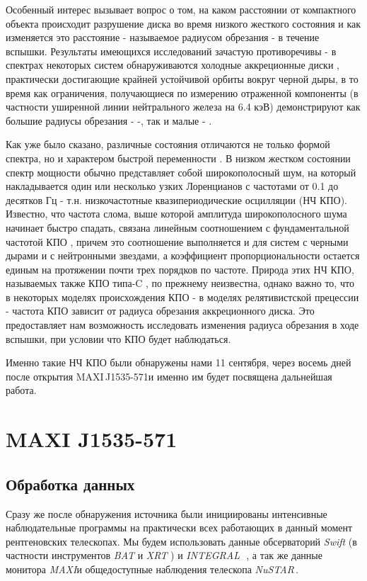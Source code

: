 \documentclass{pazhb}
\def\maxisrc{MAXI\,J1535-571}
\def\maxi{{\em MAXI}}
\def\nustar{{\em NuSTAR\,}}
\def\integral{{\em INTEGRAL\,}}
\begin{document}
Особенный интерес вызывает вопрос о том, на каком расстоянии от компактного объекта происходит разрушение диска во время низкого жесткого состояния и как изменяется это расстояние - называемое радиусом обрезания - в течение вспышки. Результаты имеющихся исследований зачастую противоречивы - в спектрах некоторых систем обнаруживаются холодные аккреционные диски \citep[с температурой в 0.1..0.5 кэВ:][]{miller06, miller06gx339,reis11}, практически достигающие крайней устойчивой орбиты вокруг черной дыры, в то время как ограничения, получающиеся по измерению отраженной компоненты (в частности уширенной линии нейтрального железа на 6.4 кэВ) демонстрируют как большие радиусы обрезания - \cite{furst15_gx339} -, так и малые - \cite{miller15_grs}. 

Как уже было сказано, различные состояния отличаются не только формой спектра, но и характером быстрой переменности \citep{belloni10}. В низком жестком состоянии спектр мощности обычно представляет собой широкополосный шум, на который накладывается один или несколько узких Лоренцианов с частотами от 0.1 до десятков Гц - т.н. низкочастотные квазипериодические осцилляции (НЧ КПО). Известно, что частота слома, выше которой амплитуда широкополосного шума начинает быстро спадать, связана линейным соотношением с фундаментальной частотой КПО \citep{wijnands99}, причем это соотношение выполняется и для систем с черными дырами и с нейтронными звездами, а коэффициент пропорциональности остается единым на протяжении почти трех порядков по частоте. Природа этих НЧ КПО, называемых также КПО типа-C \citep{casella05}, по прежнему неизвестна, однако важно то, что в некоторых моделях происхождения КПО - в моделях релятивистской прецессии \citep{stella98} - частота КПО зависит от радиуса обрезания аккреционного диска. Это предоставляет нам возможность исследовать изменения радиуса обрезания в ходе вспышки, при условии что КПО будет наблюдаться.

Именно такие НЧ КПО были обнаружены нами \citep{mereminskiy17ATel10734} 11 сентября, через восемь дней после открытия \maxisrc и именно им будет посвящена дальнейшая работа.


\section{MAXI J1535-571}
\subsection{Обработка данных}	
Сразу же после обнаружения источника были инициированы интенсивные наблюдательные программы на практически всех работающих в данный момент рентгеновских телескопах. Мы будем использовать данные обсерваторий {\em Swift} (в частности инструментов {\em BAT} \citep{barthelmy05} и {\em XRT} \citep{burrows00})  и \integral\, \citep{winkler03}, а так же данные монитора \maxi и общедоступные наблюдения телескопа \nustar \citep{harrison13_nust}.
\end{document}
